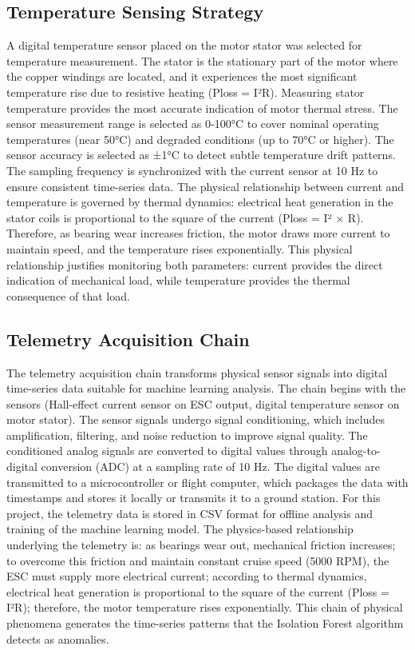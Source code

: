 \subsection{Temperature Sensing Strategy}

A digital temperature sensor placed on the motor stator was selected for temperature measurement. The stator is the stationary part of the motor where the copper windings are located, and it experiences the most significant temperature rise due to resistive heating (Ploss = I²R). Measuring stator temperature provides the most accurate indication of motor thermal stress. The sensor measurement range is selected as 0-100°C to cover nominal operating temperatures (near 50°C) and degraded conditions (up to 70°C or higher). The sensor accuracy is selected as ±1°C to detect subtle temperature drift patterns. The sampling frequency is synchronized with the current sensor at 10 Hz to ensure consistent time-series data. The physical relationship between current and temperature is governed by thermal dynamics: electrical heat generation in the stator coils is proportional to the square of the current (Ploss = I² × R). Therefore, as bearing wear increases friction, the motor draws more current to maintain speed, and the temperature rises exponentially. This physical relationship justifies monitoring both parameters: current provides the direct indication of mechanical load, while temperature provides the thermal consequence of that load.

\subsection{Telemetry Acquisition Chain}

The telemetry acquisition chain transforms physical sensor signals into digital time-series data suitable for machine learning analysis. The chain begins with the sensors (Hall-effect current sensor on ESC output, digital temperature sensor on motor stator). The sensor signals undergo signal conditioning, which includes amplification, filtering, and noise reduction to improve signal quality. The conditioned analog signals are converted to digital values through analog-to-digital conversion (ADC) at a sampling rate of 10 Hz. The digital values are transmitted to a microcontroller or flight computer, which packages the data with timestamps and stores it locally or transmits it to a ground station. For this project, the telemetry data is stored in CSV format for offline analysis and training of the machine learning model. The physics-based relationship underlying the telemetry is: as bearings wear out, mechanical friction increases; to overcome this friction and maintain constant cruise speed (5000 RPM), the ESC must supply more electrical current; according to thermal dynamics, electrical heat generation is proportional to the square of the current (Ploss = I²R); therefore, the motor temperature rises exponentially. This chain of physical phenomena generates the time-series patterns that the Isolation Forest algorithm detects as anomalies.

